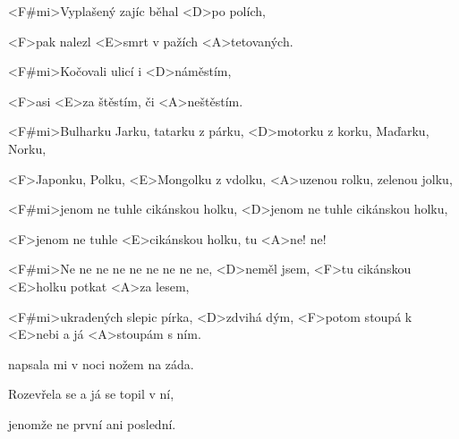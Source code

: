 

\zs
<F#mi>Vyplašený zajíc běhal
<D>po polích,

<F>pak nalezl <E>smrt v pažích
<A>tetovaných.

<F#mi>Kočovali ulicí i
<D>náměstím,

<F>asi <E>za štěstím,
či <A>neštěstím.
\ks

\zr
<F#mi>Bulharku Jarku, tatarku z párku,
<D>motorku z korku, Maďarku, Norku,

<F>Japonku, Polku, <E>Mongolku z vdolku,
<A>uzenou rolku, zelenou jolku,

<F#mi>jenom ne tuhle cikánskou holku,
<D>jenom ne tuhle cikánskou holku,

<F>jenom ne tuhle <E>cikánskou holku,
tu <A>ne! ne!

<F#mi>Ne ne ne ne ne ne ne ne ne, <D>neměl jsem,
<F>tu cikánskou <E>holku potkat <A>za lesem,

<F#mi>ukradených slepic pírka, <D>zdvihá dým,
<F>potom stoupá k <E>nebi a já <A>stoupám s ním.
\kr

\zs
{}

napsala mi v noci nožem
na záda.

Rozevřela se a já se
topil v ní,

jenomže ne první ani
poslední.
\ks

\zr \kr

\kp





